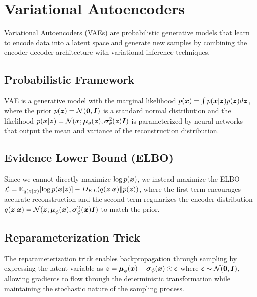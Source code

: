 
\section{Variational Autoencoders }
\label{sec:vae}

Variational Autoencoders (VAEs) are probabilistic generative models that learn to encode data into a latent space and generate new samples by combining the encoder-decoder architecture with variational inference techniques.

\subsection{Probabilistic Framework}

VAE is a generative model with the marginal likelihood $p(\boldsymbol{x}) = \int p(\boldsymbol{x}|\boldsymbol{z}) p(\boldsymbol{z}) d\boldsymbol{z}$, where the prior $p(\boldsymbol{z}) = \mathcal{N}(\boldsymbol{0}, \boldsymbol{I})$ is a standard normal distribution and the likelihood $p(\boldsymbol{x}|\boldsymbol{z}) = \mathcal{N}(\boldsymbol{x}; \boldsymbol{\mu}_{\theta}(\boldsymbol{z}), \boldsymbol{\sigma}^2_{\theta}(\boldsymbol{z})\boldsymbol{I})$ is parameterized by neural networks that output the mean and variance of the reconstruction distribution.

\subsection{Evidence Lower Bound (ELBO)}

Since we cannot directly maximize $\log p(\boldsymbol{x})$, we instead maximize the ELBO $\mathcal{L} = \mathbb{E}_{q(\boldsymbol{z}|\boldsymbol{x})}[\log p(\boldsymbol{x}|\boldsymbol{z})] - D_{KL}(q(\boldsymbol{z}|\boldsymbol{x}) \| p(\boldsymbol{z}))$, where the first term encourages accurate reconstruction and the second term regularizes the encoder distribution $q(\boldsymbol{z}|\boldsymbol{x}) = \mathcal{N}(\boldsymbol{z}; \boldsymbol{\mu}_{\phi}(\boldsymbol{x}), \boldsymbol{\sigma}^2_{\phi}(\boldsymbol{x})\boldsymbol{I})$ to match the prior.

\subsection{Reparameterization Trick}

The reparameterization trick enables backpropagation through sampling by expressing the latent variable as $\boldsymbol{z} = \boldsymbol{\mu}_{\phi}(\boldsymbol{x}) + \boldsymbol{\sigma}_{\phi}(\boldsymbol{x}) \odot \boldsymbol{\epsilon}$ where $\boldsymbol{\epsilon} \sim \mathcal{N}(\boldsymbol{0}, \boldsymbol{I})$, allowing gradients to flow through the deterministic transformation while maintaining the stochastic nature of the sampling process.

